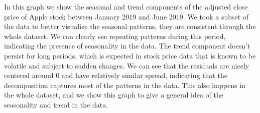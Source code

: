 \documentclass[12pt]{article}
\theoremstyle{definition}
\begin{document}
\begin{minipage}{0.5\textwidth} %
\end{minipage}%
\hfill %
\begin{minipage}{0.45\textwidth} %
  In this graph we show the seasonal and trend components of the adjusted close price of Apple stock between January 2019 and June 2019. 
  We took a subset of the data to better visualize the seasonal patterns, they are consistent through the whole dataset.
  We can clearly see repeating patterns during this period, indicating the presence of seasonality in the data.
  The trend component doesn't persist for long periods, which is expected in stock price data that is known to be volatile and subject to sudden changes.
  We can see that the residuals are nicely centered around \(0\) and have relatively similar spread, indicating that the decomposition captures most of the patterns in the data. 
  This also happens in the whole dataset, and we show this graph to give a general idea of the seasonality and trend in the data.
\end{minipage}
\end{document}
